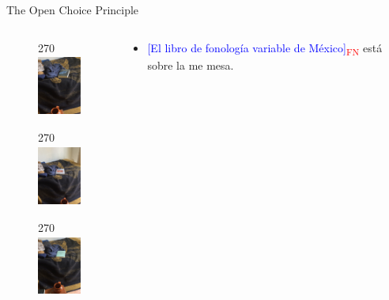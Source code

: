 \documentclass{beamer}
\begin{document}
\begin{frame}{The Open Choice Principle}
	\begin{columns}
    	\begin{column}{6cm}
        	\begin{figure}
            	\begin{turn}{270}
                \includegraphics[height=2.0cm, width=1.6cm]{pbm.JPG}
                \end{turn}
            \end{figure}
            \begin{figure}
            	\begin{turn}{270}
    			\includegraphics[height=2.0cm, width=1.6cm]{hayes.JPG}
                \end{turn}
            \end{figure}
            \begin{figure}
            	\begin{turn}{270}
    			\includegraphics[height=2.0cm, width=1.6cm]{sonoro.JPG}
                \end{turn}
            \end{figure}
        \end{column}
        \begin{column}{6cm}
        \begin{itemize}
        \vspace{2em}
        \item \textcolor{blue}{{[El libro de fonología variable de México]}}\textcolor{red}{\textsubscript{FN}} está sobre la me mesa.
        \begin{itemize}
        	\pause

\end{itemize}
\end{itemize}
\end{column}
\end{columns}
\end{frame}
\end{document}
